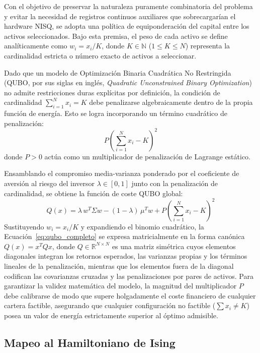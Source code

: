 Con el objetivo de preservar la naturaleza puramente combinatoria del problema y evitar la necesidad de registros continuos auxiliares que sobrecargarían el hardware NISQ, se adopta una política de equiponderación del capital entre los activos seleccionados. Bajo esta premisa, el peso de cada activo se define analíticamente como $w_i = x_i / K$, donde $K \in \mathbb{N}$ ($1 \le K \le N$) representa la cardinalidad estricta o número exacto de activos a seleccionar.

Dado que un modelo de Optimización Binaria Cuadrática No Restringida (QUBO, por sus siglas en inglés, \textit{Quadratic Unconstrained Binary Optimization}) no admite restricciones duras explícitas por definición, la condición de cardinalidad $\sum_{i=1}^N x_i = K$ debe penalizarse algebraicamente dentro de la propia función de energía. Esto se logra incorporando un término cuadrático de penalización:
\begin{equation}
    P \left( \sum_{i=1}^N x_i - K \right)^2
    \label{eq:penalizacion_cardinalidad}
\end{equation}
donde $P > 0$ actúa como un multiplicador de penalización de Lagrange estático.

Ensamblando el compromiso media-varianza ponderado por el coeficiente de aversión al riesgo del inversor $\lambda \in [0, 1]$ junto con la penalización de cardinalidad, se obtiene la función de coste QUBO global:
\begin{equation}
    Q(x) = \lambda \, w^T \Sigma w - (1-\lambda)\, \mu^T w + P \left( \sum_{i=1}^N x_i - K \right)^2
    \label{eq:qubo_completo}
\end{equation}
Sustituyendo $w_i = x_i / K$ y expandiendo el binomio cuadrático, la Ecuación~\eqref{eq:qubo_completo} se expresa matricialmente en la forma canónica $Q(x) = x^T Q x$, donde $Q \in \mathbb{R}^{N \times N}$ es una matriz simétrica cuyos elementos diagonales integran los retornos esperados, las varianzas propias y los términos lineales de la penalización, mientras que los elementos fuera de la diagonal codifican las covarianzas cruzadas y las penalizaciones por pares de activos. Para garantizar la validez matemática del modelo, la magnitud del multiplicador $P$ debe calibrarse de modo que supere holgadamente el coste financiero de cualquier cartera factible, asegurando que cualquier configuración no factible ($\sum x_i \neq K$) posea un valor de energía estrictamente superior al óptimo admisible.

\subsection{Mapeo al Hamiltoniano de Ising}
\label{subsec:mapeo_ising}

